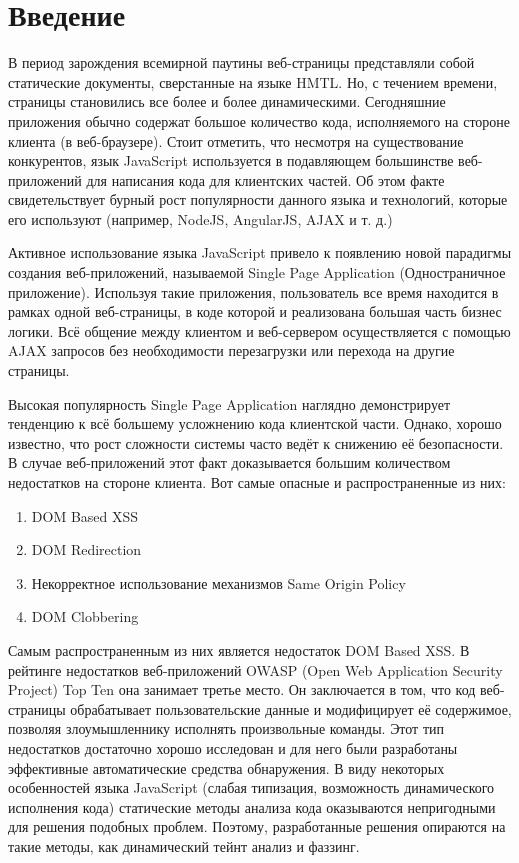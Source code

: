 
\chapter{Введение}\label{Introduction}

В период зарождения всемирной паутины веб-страницы представляли собой статические документы, сверстанные на языке HMTL. Но, с течением времени, страницы становились все более и более динамическими. Сегодняшние приложения обычно содержат большое количество кода, исполняемого на стороне клиента (в веб-браузере). Стоит отметить, что несмотря на существование конкурентов, язык JavaScript используется в подавляющем большинстве веб-приложений для написания кода для клиентских частей. Об этом факте свидетельствует бурный рост популярности данного языка и технологий, которые его используют (например, NodeJS, AngularJS, AJAX и т. д.)


Активное использование языка JavaScript привело к появлению новой парадигмы создания веб-приложений, называемой Single Page Application (Одностраничное приложение). Используя такие приложения, пользователь все время находится в рамках одной веб-страницы, в коде которой и реализована большая часть бизнес логики. Всё общение между клиентом и веб-сервером осуществляется с помощью AJAX запросов без необходимости перезагрузки или перехода на другие страницы.


Высокая популярность Single Page Application наглядно демонстрирует тенденцию к всё большему усложнению кода клиентской части. Однако, хорошо известно, что рост сложности системы часто ведёт к снижению её безопасности. В случае веб-приложений этот факт доказывается большим количеством недостатков на стороне клиента. Вот самые опасные и распространенные из них:

\begin{enumerate}
	\item DOM Based XSS
	\item DOM Redirection
	\item Некорректное использование механизмов Same Origin Policy
	\item DOM Clobbering
\end{enumerate}


Самым распространенным из них является недостаток DOM Based XSS. В рейтинге недостатков веб-приложений OWASP (Open Web Application Security Project) Top Ten она занимает третье место. Он заключается в том, что код веб-страницы обрабатывает пользовательские данные и модифицирует её содержимое, позволяя злоумышленнику исполнять произвольные команды. Этот тип недостатков достаточно хорошо исследован и для него были разработаны эффективные автоматические средства обнаружения. В виду некоторых особенностей языка JavaScript (слабая типизация, возможность динамического исполнения кода) статические методы анализа кода оказываются непригодными для решения подобных проблем. Поэтому, разработанные решения опираются на такие методы, как динамический тейнт анализ и фаззинг.


